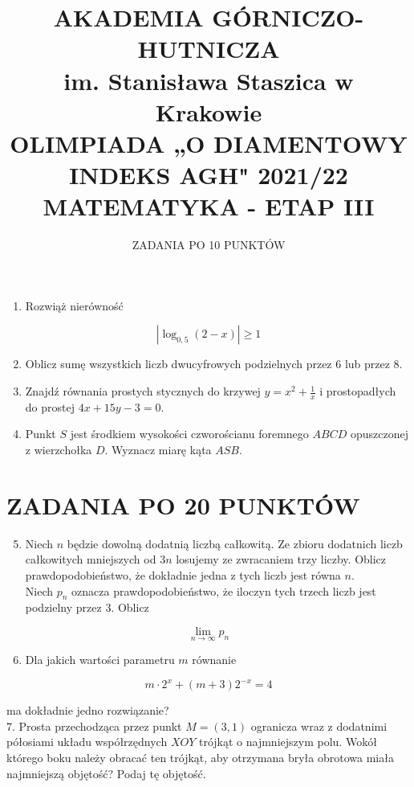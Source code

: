 \documentclass[10pt]{article}
\title{AKADEMIA GÓRNICZO-HUTNICZA \\
 im. Stanisława Staszica w Krakowie \\
 OLIMPIADA „O DIAMENTOWY INDEKS AGH" 2021/22 \\
 MATEMATYKA - ETAP III }
\author{ZADANIA PO 10 PUNKTÓW}
\date{}
\begin{document}
\maketitle


\begin{enumerate}
  \item Rozwiąż nierówność
\end{enumerate}

$$
\left|\log _{0,5}(2-x)\right| \geqslant 1
$$

\begin{enumerate}
  \setcounter{enumi}{1}
  \item Oblicz sumę wszystkich liczb dwucyfrowych podzielnych przez 6 lub przez 8.
  \item Znajdź równania prostych stycznych do krzywej $y=x^{2}+\frac{1}{x}$ i prostopadłych do prostej $4 x+15 y-3=0$.
  \item Punkt $S$ jest środkiem wysokości czworościanu foremnego $A B C D$ opuszczonej z wierzchołka $D$. Wyznacz miarę kąta $A S B$.
\end{enumerate}

\section*{ZADANIA PO 20 PUNKTÓW}
\begin{enumerate}
  \setcounter{enumi}{4}
  \item Niech $n$ będzie dowolną dodatnią liczbą całkowitą. Ze zbioru dodatnich liczb całkowitych mniejszych od $3 n$ losujemy ze zwracaniem trzy liczby. Oblicz prawdopodobieństwo, że dokładnie jedna z tych liczb jest równa $n$.\\
Niech $p_{n}$ oznacza prawdopodobieństwo, że iloczyn tych trzech liczb jest podzielny przez 3. Oblicz
\end{enumerate}

$$
\lim _{n \rightarrow \infty} p_{n}
$$

\begin{enumerate}
  \setcounter{enumi}{5}
  \item Dla jakich wartości parametru $m$ równanie
\end{enumerate}

$$
m \cdot 2^{x}+(m+3) 2^{-x}=4
$$

ma dokładnie jedno rozwiązanie?\\
7. Prosta przechodząca przez punkt $M=(3,1)$ ogranicza wraz z dodatnimi półosiami układu współrzędnych $X O Y$ trójkąt o najmniejszym polu. Wokół którego boku należy obracać ten trójkąt, aby otrzymana bryła obrotowa miała najmniejszą objętość? Podaj tę objętość.
\end{document}
